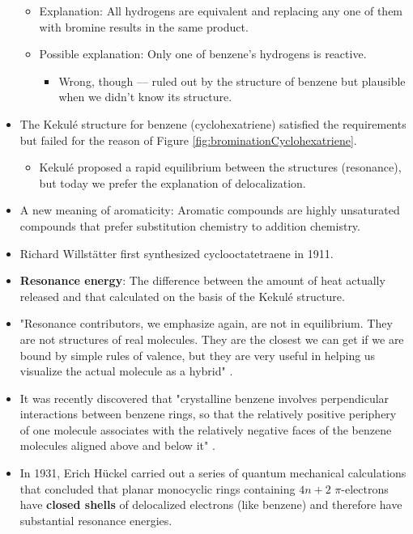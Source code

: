 \documentclass[../notes.tex]{subfiles}
\begin{document}
\begin{itemize}
    \begin{itemize}
        \item Explanation: All hydrogens are equivalent and replacing any one of them with bromine results in the same product.
        \item Possible explanation: Only one of benzene's hydrogens is reactive.
        \begin{itemize}
            \item Wrong, though --- ruled out by the structure of benzene but plausible when we didn't know its structure.
        \end{itemize}
    \end{itemize}
    \item The Kekul\'{e} structure for benzene (cyclohexatriene) satisfied the requirements but failed for the reason of Figure \ref{fig:brominationCyclohexatriene}.
    \begin{itemize}
        \item Kekul\'{e} proposed a rapid equilibrium between the structures (resonance), but today we prefer the explanation of delocalization.
    \end{itemize}
    \item A new meaning of aromaticity: Aromatic compounds are highly unsaturated compounds that prefer substitution chemistry to addition chemistry.
    \item Richard Willst\"{a}tter first synthesized cyclooctatetraene in 1911.
    \item \textbf{Resonance energy}: The difference between the amount of heat actually released and that calculated on the basis of the Kekul\'{e} structure.
    \item "Resonance contributors, we emphasize again, are not in equilibrium. They are not structures of real molecules. They are the closest we can get if we are bound by simple rules of valence, but they are very useful in helping us visualize the actual molecule as a hybrid" \parencite[625]{bib:SolomonsEtAl}.
    \item It was recently discovered that "crystalline benzene involves perpendicular interactions between benzene rings, so that the relatively positive periphery of one molecule associates with the relatively negative faces of the benzene molecules aligned above and below it" \parencite[627]{bib:SolomonsEtAl}.
    \item In 1931, Erich H\"{u}ckel carried out a series of quantum mechanical calculations that concluded that planar monocyclic rings containing $4n+2$ $\pi$-electrons have \textbf{closed shells} of delocalized electrons (like benzene) and therefore have substantial resonance energies.

\end{itemize}
\end{document}
